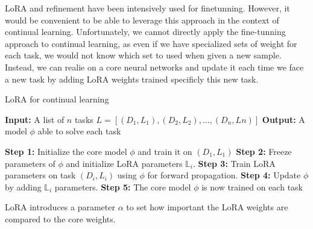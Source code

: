 \documentclass{article}
\begin{document}
LoRA and refinement have been intensively used for finetunning. However, it would be convenient to be able to  leverage this approach in the context of continual learning. Unfortunately, we cannot directly apply the fine-tunning approach to continual learning, as even if we have specialized sets of weight for each task, we would not know which set to used when given a new sample. Instead, we can realie on a core neural networks and update it each time we face a new task by adding LoRA weights trained specificly this new task.

\begin{algorithm}
\caption{LoRA for continual learning}
\begin{algorithmic}[1]
\State \textbf{Input:} A list of $n$ tasks $L = [(D_1,L_1), (D_2,L_2), \ldots, (D_n,Ln)]$
\State \textbf{Output:} A model $\phi$ able to solve each task
\State

\State \textbf{Step 1:} Initialize the core model $\phi$ and train it on $(D_1,L_1)$
    \State \textbf{Step 2:} Freeze parameters of $\phi$ and initialize LoRA parameters $\mathbb{L}_i$.
    \State \textbf{Step 3:} Train LoRA parameters on task $(D_i,L_i)$ using $\phi$ for forward propagation.
    \State \textbf{Step 4:} Update $\phi$ by adding $\mathbb{L}_i$ parameters.
\EndFor
\State \textbf{Step 5:} The core model $\phi$ is now trained on each task
\end{algorithmic}
\end{algorithm}

LoRA introduces a parameter $\alpha$ to set how important the LoRA weights are compared to the core weights.
\end{document}

